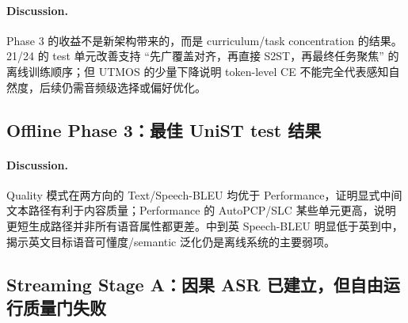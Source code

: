 \documentclass[11pt,a4paper]{article}
\begin{document}
\paragraph{Discussion.}
Phase 3 的收益不是新架构带来的，而是 curriculum/task concentration 的结果。21/24 的 test 单元改善支持 ``先广覆盖对齐，再直接 S2ST，再最终任务聚焦'' 的离线训练顺序；但 UTMOS 的少量下降说明 token-level CE 不能完全代表感知自然度，后续仍需音频级选择或偏好优化。

\subsection{Offline Phase 3：最佳 UniST test 结果}

\begin{table}[H]
\centering
\caption{最佳 Offline Phase 3 `iter\_0009075` 在 UniST test 上的完整主要指标。}
\label{tab:p3_test}
\end{table}

\paragraph{Discussion.}
Quality 模式在两方向的 Text/Speech-BLEU 均优于 Performance，证明显式中间文本路径有利于内容质量；Performance 的 AutoPCP/SLC 某些单元更高，说明更短生成路径并非所有语音属性都更差。中到英 Speech-BLEU 明显低于英到中，揭示英文目标语音可懂度/semantic 泛化仍是离线系统的主要弱项。

\subsection{Streaming Stage A：因果 ASR 已建立，但自由运行质量门失败}
\end{document}
